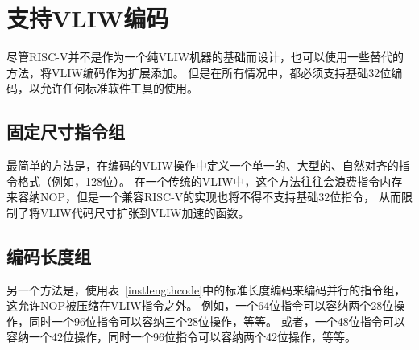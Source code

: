 \section{支持VLIW编码}

尽管RISC-V并不是作为一个纯VLIW机器的基础而设计，也可以使用一些替代的方法，将VLIW编码作为扩展添加。
但是在所有情况中，都必须支持基础32位编码，以允许任何标准软件工具的使用。

\subsection*{固定尺寸指令组}

最简单的方法是，在编码的VLIW操作中定义一个单一的、大型的、自然对齐的指令格式（例如，128位）。
在一个传统的VLIW中，这个方法往往会浪费指令内存来容纳NOP，但是一个兼容RISC-V的实现也将不得不支持基础32位指令，
从而限制了将VLIW代码尺寸扩张到VLIW加速的函数。

\subsection*{编码长度组}

另一个方法是，使用表~\ref{instlengthcode}中的标准长度编码来编码并行的指令组，这允许NOP被压缩在VLIW指令之外。
例如，一个64位指令可以容纳两个28位操作，同时一个96位指令可以容纳三个28位操作，等等。
或者，一个48位指令可以容纳一个42位操作，同时一个96位指令可以容纳两个42位操作，等等。

